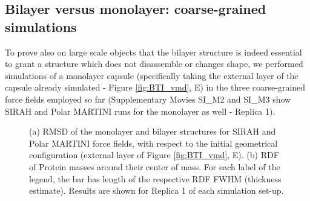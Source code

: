 \subsection{Bilayer versus monolayer: coarse-grained simulations} \label{sec:mono}
To prove also on large scale objects that the bilayer structure is indeed essential to grant a structure which does not disassemble or changes shape, we performed simulations of a monolayer capsule (specifically taking the external layer of the capsule already simulated - Figure \ref{fig:BTI_vmd}, E) in the three coarse-grained force fields employed so far (Supplementary Movies SI\_M2 and SI\_M3 show SIRAH and Polar MARTINI runs for the monolayer as well - Replica 1).
%
\begin{figure}[h!]
    \caption[Comparison of monolayer and bilayer structural properties]{(a) RMSD of the monolayer and bilayer structures for SIRAH and Polar MARTINI force fields, with respect to the initial geometrical configuration (external layer of Figure \ref{fig:BTI_vmd}, E). (b) RDF of Protein masses around their center of mass. For each label of the legend, the bar has length of the respective RDF FWHM (thickness estimate). Results are shown for Replica 1 of each simulation set-up.}
\label{fig:mono_bi}
\end{figure}

